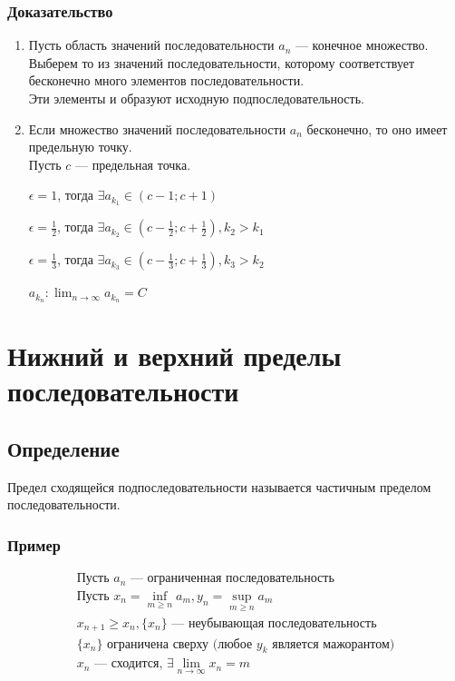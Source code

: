\documentclass{article}
\begin{document}
\subsubsection{Доказательство}
\begin{enumerate}
    \item Пусть область значений последовательности $a_n$ --- конечное множество. \\
          Выберем то из значений последовательности, которому соответствует бесконечно много элементов последовательности. \\
          Эти элементы и образуют исходную подпоследовательность.
    \item Если множество значений последовательности $a_n$ бесконечно, то оно имеет предельную точку. \\
          Пусть $c$ --- предельная точка.

          $\epsilon = 1$, тогда $\exists a_{k_1} \in (c - 1 ; c + 1)$

          $\epsilon = \frac{1}{2}$, тогда $\exists a_{k_2} \in (c - \frac{1}{2} ; c + \frac{1}{2}), k_2 > k_1$

          $\epsilon = \frac{1}{3}$, тогда $\exists a_{k_3} \in (c - \frac{1}{3} ; c + \frac{1}{3}), k_3 > k_2$

          ${a_{k_n}}: \lim_{n \to \infty} a_{k_n} = C$ \\
\end{enumerate}



\section{Нижний и верхний пределы последовательности}

\subsection{Определение}
Предел сходящейся подпоследовательности называется частичным пределом последовательности.

\subsubsection{Пример}
\begin{gather*}
    \text{Пусть } a_n \text{ --- ограниченная последовательность} \\
    \text{Пусть } x_n = \inf_{m \ge n} a_m, y_n = \sup_{m \ge n} a_m \\
    x_{n+1} \ge x_n, \{x_n\} \text{ --- неубывающая последовательность} \\
    \{x_n\} \text{ ограничена сверху (любое $y_k$ является мажорантом)} \\
    x_n \text{ --- сходится, } \exists \lim_{n \to \infty} x_n = m
\end{gather*}
\end{document}
